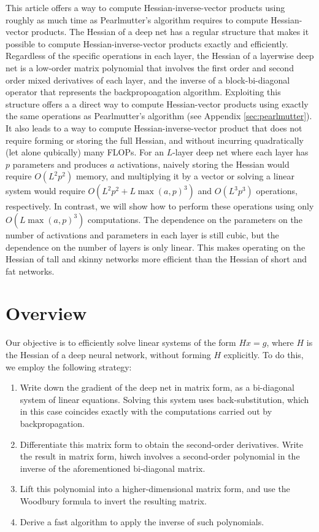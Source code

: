 \documentclass{article}
\begin{document}
This article offers a way to compute Hessian-inverse-vector products using roughly as much time as Pearlmutter's
algorithm requires to compute Hessian-vector products. The Hessian of a deep net has a regular structure that makes it
possible to compute Hessian-inverse-vector products exactly and efficiently. Regardless of the specific operations in
each layer, the Hessian of a layerwise deep net is a low-order matrix polynomial that involves the first order and
second order mixed derivatives of each layer, and the inverse of a block-bi-diagonal operator that represents the
backpropoagation algorithm. Exploiting this structure offers a a direct way to compute Hessian-vector products using
exactly the same operations as Pearlmutter's algorithm (see Appendix \ref{sec:pearlmutter}). It also leads to a way to
compute Hessian-inverse-vector product that does not require forming or storing the full Hessian, and without incurring
quadratically (let alone qubically) many FLOPs. For an $L$-layer deep net where each layer has $p$ parameters and
produces $a$ activations, naively storing the Hessian would require $O(L^2p^2)$ memory, and multiplying it by a vector
or solving a linear system would require $O(L^2p^2 + L\max(a,p)^3)$ and $O(L^3p^3)$ operations, respectively. In
contrast, we will show how to perform these operations using only $O(L \max(a, p)^3)$ computations. The dependence on
the parameters on the number of activations and parameters in each layer is still cubic, but the dependence on the
number of layers is only linear. This makes operating on the Hessian of tall and skinny networks more efficient than
the Hessian of short and fat networks.

\section{Overview}

Our objective is to efficiently solve linear systems of the form $H x = g$, where $H$ is the Hessian of a deep neural
network, without forming $H$ explicitly. To do this, we employ the following strategy:
\begin{enumerate}
    \item
          Write down the gradient of the deep net in matrix form, as a bi-diagonal system of linear
          equations. Solving this system uses back-substitution, which in this case
          coincides exactly with the computations carried out by backpropagation.
    \item
          Differentiate this matrix form to obtain the second-order derivatives. Write the result in matrix form,
          hiwch involves a second-order polynomial in the inverse of the aforementioned bi-diagonal matrix.
    \item
          Lift this polynomial into a higher-dimensional matrix form, and use the Woodbury formula to invert the resulting
          matrix.
    \item
          Derive a fast algorithm to apply the inverse of such polynomials.
\end{enumerate}
\end{document}
